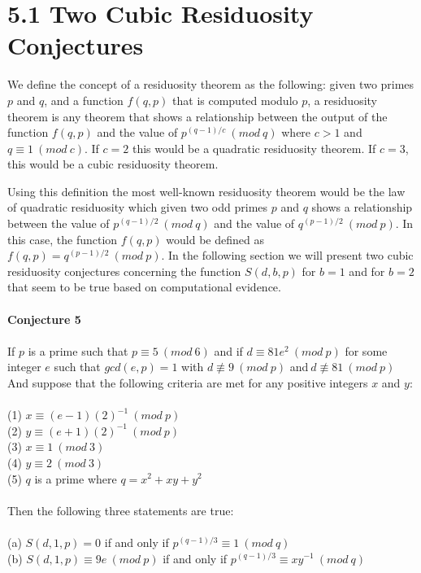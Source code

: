 \documentclass[final,letterpaper,oneside,10pt]{article}
\begin{document}
\section*{5.1 Two Cubic Residuosity Conjectures }

We define the concept of a residuosity theorem as the following: given two primes $p$ and $q$, and a function $f(q,p)$ that is computed modulo $p$,
a residuosity theorem is any theorem that shows a relationship between the output of the function $f(q,p)$ and the value of $p^{(q-1)/c}~(mod~q)$
where $c>1$ and $q \equiv 1~(mod~c)$.  If $c=2$ this would be a quadratic residuosity theorem.  If $c=3$, this would be a cubic residuosity theorem.

Using this definition the most well-known residuosity theorem would be the law of quadratic residuosity which given two odd primes $p$ and $q$ shows a
relationship between the value of $p^{(q-1)/2}~(mod~q)$ and the value of $q^{(p-1)/2}~(mod~p)$.  In this case, the function $f(q,p)$ would be 
defined as $f(q,p) = q^{(p-1)/2}~(mod~p)$.  In the following section we will present two cubic residuosity conjectures concerning the function $S(d,b,p)$
for $b=1$ and for $b=2$ that seem to be true based on computational evidence.
\\
\\
\textbf{Conjecture 5}
\\
\\
If $p$ is a prime such that $p \equiv 5~(mod~6)$ and if $d \equiv 81e^2~(mod~p)$ for some integer $e$ such that $gcd(e,p)=1$ with 
$d \not\equiv 9~(mod~p) $ and$~d \not\equiv 81~(mod~p) $
\\
And suppose that the following criteria are met for any positive integers $x$ and $y$:
\\
\\
(1) $x \equiv (e-1)(2)^{-1}~(mod~p)$
\\
(2) $y \equiv (e+1)(2)^{-1}~(mod~p)$
\\
(3) $x \equiv 1~(mod~3)$
\\
(4) $y \equiv 2~(mod~3)$
\\
(5) $q$ is a prime where $q = x^2 +xy + y^2$
\\
\\
Then the following three statements are true:
\\
\\
(a) $S(d,1,p) = 0$ if and only if $p^{(q-1)/3} \equiv 1~(mod~q)$
\\
(b) $S(d,1,p) \equiv 9e~(mod~p)$  if and only if $p^{(q-1)/3} \equiv xy^{-1}~(mod~q)$
\end{document}
